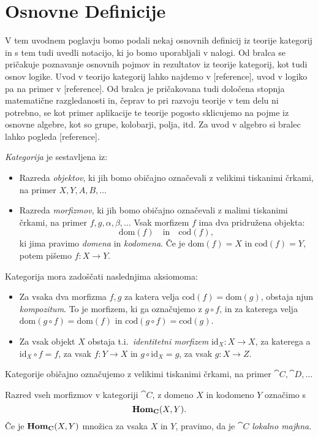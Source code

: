 \documentclass[../kategoricna_logika.tex]{subfiles}
\begin{document}
\section{Osnovne Definicije}
%
V tem uvodnem poglavju bomo podali nekaj osnovnih definicij iz
teorije kategorij in s tem tudi uvedli notacijo,
ki jo bomo uporabljali v nalogi.
Od bralca se pričakuje poznavanje osnovnih pojmov in rezultatov iz
teorije kategorij, kot tudi osnov logike.
Uvod v teorijo kategorij lahko najdemo v [reference],
uvod v logiko pa na primer v [reference].
Od bralca je pričakovana tudi določena stopnja matematične razgledanosti
in, čeprav to pri razvoju teorije v tem delu ni potrebno, se kot
primer aplikacije te teorije pogosto sklicujemo na pojme iz
osnovne algebre, kot so grupe, kolobarji, polja, itd.
Za uvod v algebro si bralec lahko pogleda [reference].
\begin{definicija}
  \emph{Kategorija} je sestavljena iz:
  \begin{itemize}
  \item Razreda \emph{objektov}, ki jih bomo običajno označevali z
    velikimi tiskanimi črkami, na primer $X, Y, A, B, \ldots$
  \item Razreda \emph{morfizmov}, ki jih bomo običajno označevali z
    malimi tiskanimi črkami, na primer $f,g,\alpha,\beta, \ldots$
    Vsak morfizem $f$ ima dva pridružena objekta:
    \[ \mathrm{dom}(f) \quad \text{in} \quad \mathrm{cod}(f), \]
    ki jima pravimo \emph{domena} in \emph{kodomena}. Če je $\mathrm{dom}(f)=X$
    in ${\mathrm{cod}(f)=Y}$, potem pišemo $f : X \to Y$.
  \end{itemize}
  Kategorija mora zadoščati naslednjima aksiomoma:
  \begin{itemize}
  \item   Za vsaka dva morfizma $f,g$ za katera velja $\mathrm{cod}(f) = \mathrm{dom}(g)$,
  obstaja njun \emph{kompozitum}. To je morfizem, ki ga označujemo z $g \circ f$, in
  za katerega velja $\mathrm{dom}(g \circ f) = \mathrm{dom}(f)$ in
  $\mathrm{cod}(g \circ f) = \mathrm{cod}(g)$.
  \item Za vsak objekt $X$ obstaja t.i.\ \emph{identitetni morfizem}
  $\mathrm{id}_X : X \to X$, za katerega a $\mathrm{id}_X \circ f = f$,
  za vsak $f : Y \to X$ in $g \circ \mathrm{id}_X = g$, za vsak $g : X \to Z$.
\end{itemize}
Kategorije običajno označujemo z velikimi tiskanimi črkami, na primer $\cat{C}, \cat{D}, \ldots$
\end{definicija}
\begin{definicija}
  Razred vseh morfizmov v kategoriji $\cat{C}$, z domeno $X$ in kodomeno $Y$ označimo s
  \[ \mathbf{Hom}_{{\operatorname{\mathbf{C}}}}(X,Y).\]
  Če je $\mathbf{Hom}_{{\operatorname{\mathbf{C}}}}(X,Y)$ množica za vsaka $X$ in $Y$, pravimo, da je $\cat{C}$
  \emph{lokalno majhna}.
\end{definicija}
\end{document}
